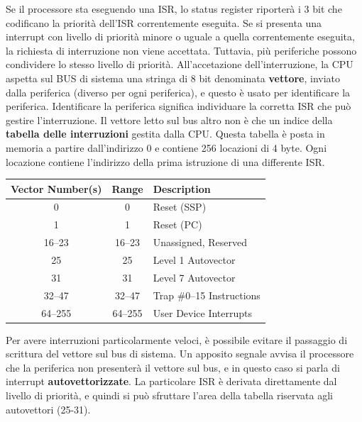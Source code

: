 Se il processore sta eseguendo una ISR, lo status register riporterà i 3 bit che codificano la priorità dell'ISR correntemente eseguita. Se si presenta una interrupt con livello di priorità minore o uguale a quella correntemente eseguita, la richiesta di interruzione non viene accettata. Tuttavia, più periferiche possono condividere lo stesso livello di priorità. All'accetazione dell'interruzione, la CPU aspetta sul BUS di sistema una stringa di 8 bit denominata \textbf{vettore}, inviato dalla periferica (diverso per ogni periferica), e questo è usato per identificare la periferica. Identificare la periferica significa individuare la corretta ISR che può gestire l'interruzione. Il vettore letto sul bus altro non è che un indice della \textbf{tabella delle interruzioni} gestita dalla CPU. Questa tabella è posta in memoria a partire dall'indirizzo 0 e contiene 256 locazioni di 4 byte. Ogni locazione contiene l'indirizzo della prima istruzione di una differente ISR.

\begin{table}[h!]
\centering
\begin{tabular}{|c|c|l|}
\hline
\textbf{Vector Number(s)} & \textbf{Range} & \textbf{Description} \\ \hline
0                         & 0              & Reset (SSP) \\ \hline
1                         & 1              & Reset (PC) \\ \hline
16--23                    & 16--23         & Unassigned, Reserved \\ \hline
25                        & 25             & Level 1 Autovector \\ \hline
31                        & 31             & Level 7 Autovector \\ \hline
32--47                    & 32--47         & Trap \#0--15 Instructions \\ \hline
64--255                   & 64--255        & User Device Interrupts \\ \hline
\end{tabular}
\end{table}

Per avere interruzioni particolarmente veloci, è possibile evitare il passaggio di scrittura del vettore sul bus di sistema. Un apposito segnale avvisa il processore che la periferica non presenterà il vettore sul bus, e in questo caso si parla di interrupt \textbf{autovettorizzate}. La particolare ISR è derivata direttamente dal livello di priorità, e quindi si può sfruttare l'area della tabella riservata agli autovettori (25-31). 

